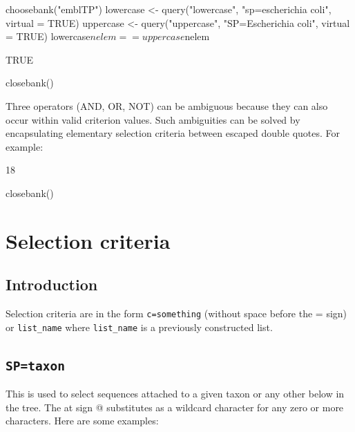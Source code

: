 \documentclass{article}
\begin{document}
\begin{Schunk}
\begin{Sinput}
 choosebank("emblTP")
 lowercase <- query("lowercase", "sp=escherichia coli", virtual = TRUE)
 uppercase <- query("uppercase", "SP=Escherichia coli", virtual = TRUE)
 lowercase$nelem == uppercase$nelem
\end{Sinput}
\begin{Soutput}
[1] TRUE
\end{Soutput}
\begin{Sinput}
 closebank()
\end{Sinput}
\end{Schunk}

Three operators (AND, OR, NOT) 
can be ambiguous because they can also occur within valid criterion values. 
Such ambiguities can be solved by encapsulating elementary selection 
criteria between escaped double quotes. For example:

\begin{Schunk}
\begin{Soutput}
[1] 18
\end{Soutput}
\begin{Sinput}
 closebank()
\end{Sinput}
\end{Schunk}

\section{Selection criteria}

\subsection{Introduction}

Selection criteria are in the form \texttt{c=something} (without space
before the = sign) or \texttt{list\_name} where \texttt{list\_name} is a
previously constructed list.

\subsection{\texttt{SP=taxon}}

This is used to select sequences attached to a given taxon or any other below in
the tree. The at sign @ substitutes as a wildcard character for any zero or more 
characters. Here are some examples:
\end{document}
